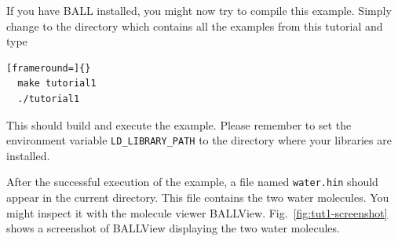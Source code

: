 If you have BALL installed, you might now try to compile this example. Simply
change to the directory  which contains all
the examples from this tutorial and type 
\begin{lstlisting}[frameround=]{}
  make tutorial1
  ./tutorial1
\end{lstlisting}
This should build and execute the example. Please remember to set the
environment variable {\tt LD\_LIBRARY\_PATH} to the directory where your
libraries are installed.

After the successful execution of the example, a file named {\tt water.hin}
should appear in the current directory. This file contains the two water
molecules. You might inspect it with the molecule viewer \mbox{BALLView}.
Fig.~\ref{fig:tut1-screenshot} shows a screenshot of \mbox{BALLView} 
displaying the two water molecules.

